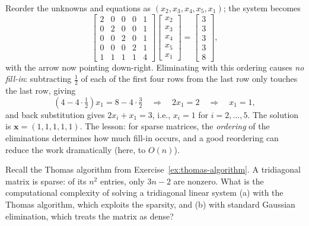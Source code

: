 \begin{solution}
    Reorder the unknowns and equations as $(x_2, x_3, x_4, x_5, x_1)$; the system becomes
    \begin{equation*}
        \begin{bmatrix}
            2 & 0 & 0 & 0 & 1 \\
            0 & 2 & 0 & 0 & 1 \\
            0 & 0 & 2 & 0 & 1 \\
            0 & 0 & 0 & 2 & 1 \\
            1 & 1 & 1 & 1 & 4
        \end{bmatrix}
        \begin{bmatrix}
            x_2 \\ x_3 \\ x_4 \\ x_5 \\ x_1
        \end{bmatrix}
        =
        \begin{bmatrix}
            3 \\ 3 \\ 3 \\ 3 \\ 8
        \end{bmatrix},
    \end{equation*}
    with the arrow now pointing down-right.
    Eliminating with this ordering causes \emph{no fill-in}: subtracting $\tfrac{1}{2}$ of each of the first four rows from the last row only touches the last row, giving
    \begin{equation*}
        \left( 4 - 4 \cdot \tfrac{1}{2} \right) x_1 = 8 - 4 \cdot \tfrac{3}{2}
        \quad\Longrightarrow\quad
        2 x_1 = 2
        \quad\Longrightarrow\quad
        x_1 = 1,
    \end{equation*}
    and back substitution gives $2 x_i + x_1 = 3$, i.e., $x_i = 1$ for $i = 2, \dots, 5$.
    The solution is $\mathbf{x} = (1, 1, 1, 1, 1)$.
    The lesson: for sparse matrices, the \emph{ordering} of the eliminations determines how much fill-in occurs, and a good reordering can reduce the work dramatically (here, to $O(n)$).
\end{solution}

\begin{exercise} %
    Recall the Thomas algorithm from Exercise~\ref{ex:thomas-algorithm}. A tridiagonal matrix is sparse: of its $n^2$ entries, only $3n-2$ are nonzero. What is the computational complexity of solving a tridiagonal linear system (a) with the Thomas algorithm, which exploits the sparsity, and (b) with standard Gaussian elimination, which treats the matrix as dense?
\end{exercise}

